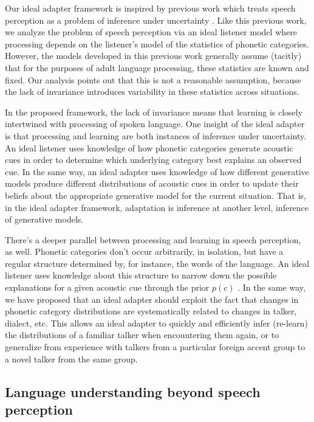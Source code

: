 Our ideal adapter framework is inspired by previous work which treats speech perception as a problem of inference under uncertainty \autocite{Clayards2008,Feldman2009a,Norris2008,Sonderegger2010}.
Like this previous work, we analyze the problem of speech perception via an ideal listener model where processing depends on the listener's model of the statistics of phonetic categories.  However, the models developed in this previous work generally assume (tacitly) that for the purposes of adult language processing, these statistics are known and fixed.
Our analysis points out that this is not a reasonable assumption, because the lack of invariance introduces variability in these statistics across situations.

In the proposed framework, the lack of invariance means that learning is closely intertwined with processing of spoken language.  One insight of the ideal adapter is that processing and learning are both instances of inference under uncertainty.  An ideal listener uses knowledge of how phonetic categories generate acoustic cues in order to determine which underlying category best explains an observed cue.  In the same way, an ideal adapter uses knowledge of how different generative models produce different distributions of acoustic cues in order to update their beliefs about the appropriate generative model for the current situation.  That is, in the ideal adapter framework, adaptation is inference at another level, inference of generative models.

There's a deeper parallel between processing and learning in speech perception, as well.  Phonetic categories don't occur arbitrarily, in isolation, but have a regular structure determined by, for instance, the words of the language.  An ideal listener uses knowledge about this structure to narrow down the possible explanations for a given acoustic cue through the prior $p(c)$ \autocite{Feldman2013b}.  In the same way, we have proposed that an ideal adapter should exploit the fact that changes in phonetic category distributions are systematically related to changes in talker, dialect, etc. This allows an ideal adapter to quickly and efficiently infer (re-learn) the distributions of a familiar talker when encountering them again, or to generalize from experience with talkers from a particular foreign accent group to a novel talker from the same group.

\subsection{Language understanding beyond speech perception}
\label{sec:impl-lang-proc}

